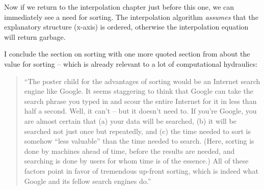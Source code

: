 Now if we return to the interpolation chapter just before this one, we can immediately see a need for sorting.  The interpolation algorithm \textit{assumes} that the explanatory structure (x-axis) is ordered, otherwise the interpolation equation will return garbage.


I conclude the section on sorting with one more quoted section from \cite{Christian2016} about the value for sorting -- which is already relevant to a lot of computational hydraulics:
\begin{quote}
``The poster child for the advantages of sorting would be an Internet search engine like Google. It seems staggering to think that Google can take the search phrase you typed in and scour the entire Internet for it in less than half a second. Well, it can't -- but it doesn't need to. If you're Google, you are almost certain that (a) your data will be searched, (b) it will be searched not just once but repeatedly, and (c) the time needed to sort is somehow ``less valuable'' than the time needed to search. (Here, sorting is done by machines ahead of time, before the results are needed, and searching is done by users for whom time is of the essence.) All of these factors point in favor of tremendous up-front sorting, which is indeed what Google and its fellow search engines do.''
\end{quote}





